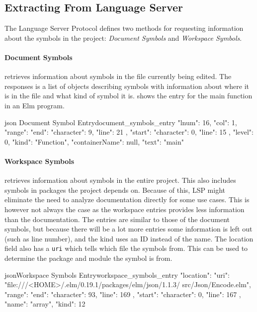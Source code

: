 \documentclass[../thesis.tex]{subfiles}
\begin{document}
\subsection{Extracting From Language Server}%
The Language Server Protocol defines two methods for requesting information about the symbols in the project: \textit{Document Symbols} and \textit{Workspace Symbols}.

\paragraph{Document Symbols} retrieves information about symbols in the file currently being edited.
The responses is a list of objects describing symbols with information about where it is in the file
and what kind of symbol it is.  shows the entry for the main function in an Elm program.
\begin{code}{ json }{Document Symbol Entry}{document_symbols_entry}
{
  "lnum": 16,
  "col": 1,
  "range": {
    "end": { "character": 9, "line": 21 },
    "start": { "character": 0, "line": 15 }
  },
  "level": 0,
  "kind": "Function",
  "containerName": null,
  "text": "main"
} 
\end{code}

\paragraph{Workspace Symbols} retrieves information about symbols in the entire project.
This also includes symbols in packages the project depends on.
Because of this, LSP might eliminate the need to analyze documentation directly for some use cases.
This is however not always the case as the workspace entries provides less information than the documentation.
The entries are similar to those of the document symbols, but because there will be a lot more entries some
information is left out (such as line number), and the kind uses an ID instead of the name.
The location field also has a \texttt{uri} which tells which file the symbols from.
This can be used to determine the package and module the symbol is from.
\begin{code}{json}{Workspace Symbols Entry}{workspace_symbols_entry}
{ 
  "location": {
  "uri":
    "file:///<HOME>/.elm/0.19.1/packages/elm/json/1.1.3/
                                    src/Json/Encode.elm",
  "range": {
    "end": { "character": 93, "line": 169 },
    "start": { "character": 0, "line": 167 }
    }
  },
  "name": "array",
  "kind": 12 
}
\end{code} 
\end{document}
